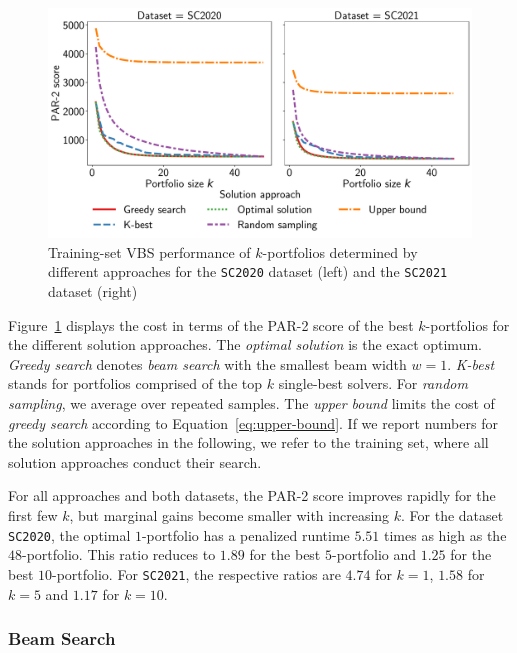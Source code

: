 \documentclass[runningheads]{llncs}
\begin{document}
\begin{figure}[htb]
	\centering
	\includegraphics[width=\columnwidth]{plots/search-train-objective.pdf}
	\caption{Training-set VBS performance of $k$-portfolios determined by different approaches for the \texttt{SC2020} dataset (left) and the \texttt{SC2021} dataset (right)}
	\label{fig:search-train-objective}
\end{figure}

Figure~\ref{fig:search-train-objective} displays the cost in terms of the PAR-2 score of the best $k$-portfolios for the different solution approaches. 
The \emph{optimal solution} is the exact optimum.
\emph{Greedy search} denotes \emph{beam search} with the smallest beam width $w=1$. 
\emph{K-best} stands for portfolios comprised of the top $k$ single-best solvers. 
For \emph{random sampling}, we average over repeated samples.
The \emph{upper bound} limits the cost of \emph{greedy search} according to Equation~\ref{eq:upper-bound}.
If we report numbers for the solution approaches in the following, we refer to the training set, where all solution approaches conduct their search.

For all approaches and both datasets, the PAR-2 score improves rapidly for the first few $k$, but marginal gains become smaller with increasing $k$.
For the dataset \texttt{SC2020}, the optimal $1$-portfolio has a penalized runtime $5.51$ times as high as the $48$-portfolio.
This ratio reduces to $1.89$ for the best $5$-portfolio and $1.25$ for the best $10$-portfolio.
For \texttt{SC2021}, the respective ratios are $4.74$ for $k=1$, $1.58$ for $k=5$ and $1.17$ for $k=10$.

\subsubsection{Beam Search}
\end{document}
